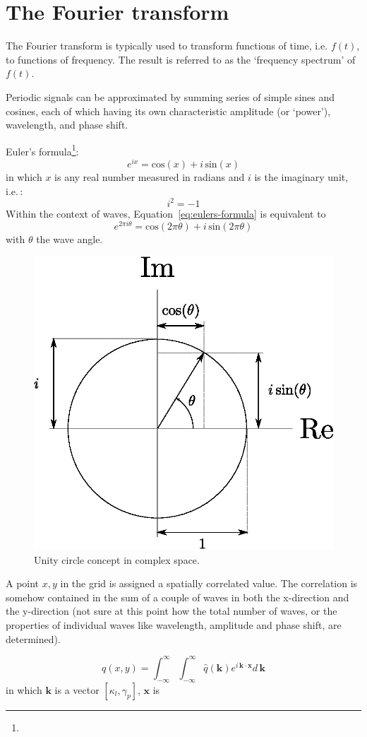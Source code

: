 
\chapter{The Fourier transform}
\label{ch:fourier}

The Fourier transform is typically used to transform functions of time, i.e. $f(t)$, to functions of frequency. The result is referred to as the `frequency spectrum' of $f(t)$.

Periodic signals can be approximated by summing series of simple sines and cosines, each of which having its own characteristic amplitude (or `power'), wavelength, and phase shift.

Euler's formula\footnote{}:
\begin{equation}
\label{eq:eulers-formula}
e^{ix} = \mathrm{cos}(x) + i\,\mathrm{sin}(x)
\end{equation}
in which $x$ is any real number measured in radians and $i$ is the imaginary unit, i.e.\,:
\begin{equation}
i^{2} = -1
\end{equation}
Within the context of waves, Equation~\ref{eq:eulers-formula} is equivalent to
\begin{equation}
e^{2\pi{}i\theta{}} = \mathrm{cos}(2\pi{}\theta{}) + i\,\mathrm{sin}(2\pi{}\theta{})
\end{equation}
with $\theta$ the wave angle.

\begin{figure}[htb]
  \centering
    \includegraphics[width=0.6\linewidth , keepaspectratio]{./../eps/unity-circle-complex-point.eps}
  \caption{Unity circle concept in complex space.}
  \label{fig:unity-circle-complex-point}
\end{figure}

A point $x,y$ in the grid is assigned a spatially correlated value. The correlation is somehow contained in the sum of a couple of waves in both the x-direction and the y-direction (not sure at this point how the total number of waves, or the properties of individual waves like wavelength, amplitude and phase shift, are determined).

\begin{equation}
q(x,y) = \int_{-\infty}^{\infty}\int_{-\infty}^{\infty}\hat{q}(\mathbf{k})e^{i\,\mathbf{k}\cdot{}\mathbf{x}}d\,\mathbf{k}
\end{equation}
in which $\mathbf{k}$ is a vector $[\kappa_l,\gamma_p]$, $\mathbf{x}$ is
